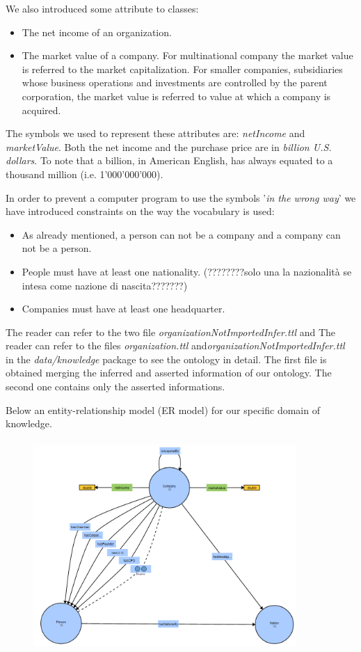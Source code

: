 We also introduced some attribute to classes:
\begin{itemize}
\item The net income of an organization.
\item The market value of a company. For multinational company the market value is referred to the market capitalization. For smaller companies, subsidiaries whose business operations and investments are controlled by the parent corporation, the market value is referred to value at which a company is acquired.
\end{itemize}
The symbols we used to represent these attributes are: \textit{ netIncome} and \textit{marketValue}.
Both the net income and the purchase price are in \textit{billion U.S. dollars}. To note that a billion, in American English, has always equated to a thousand million (i.e. 1'000'000'000).

In order to prevent a computer program to use the symbols '\textit{in the wrong way}' we have introduced  constraints on the way the vocabulary is used:
\begin{itemize}
\item As already mentioned, a person can not be a company and a company can not be a person.
\item People must have at least one nationality. (????????solo una la nazionalità se intesa come nazione di nascita???????)
\item Companies must have at least one headquarter. 
\end{itemize}

The reader can refer to the two file \textit{organizationNotImportedInfer.ttl} and \text
The reader can refer to the files \textit{organization.ttl} and\textit{organizationNotImportedInfer.ttl} in the \textit{data/knowledge} package to see the ontology in detail. The first file is obtained merging the inferred and asserted information of our ontology. The second one contains only the asserted informations.  

Below an entity-relationship model (ER model) for our specific domain of knowledge.
\begin{figure}[H]
\centering
\includegraphics[width=10cm, height=8cm]{fig/ERDiagram.png}
\end{figure}

